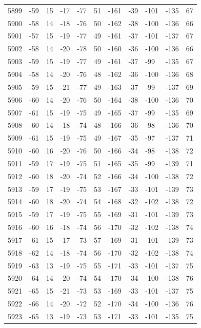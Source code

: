 \begin{table}[H]
\begin{tabular}{lllllllllll}
5899 & -59 & 15 & -17 & -77 & 51 & -161 & -39 & -101 & -135 & 67 \\
5900 & -58 & 14 & -18 & -76 & 50 & -162 & -38 & -100 & -136 & 66 \\
5901 & -57 & 15 & -19 & -77 & 49 & -161 & -37 & -101 & -137 & 67 \\
5902 & -58 & 14 & -20 & -78 & 50 & -160 & -36 & -100 & -136 & 66 \\
5903 & -59 & 15 & -19 & -77 & 49 & -161 & -37 & -99 & -135 & 67 \\
5904 & -58 & 14 & -20 & -76 & 48 & -162 & -36 & -100 & -136 & 68 \\
5905 & -59 & 15 & -21 & -77 & 49 & -163 & -37 & -99 & -137 & 69 \\
5906 & -60 & 14 & -20 & -76 & 50 & -164 & -38 & -100 & -136 & 70 \\
5907 & -61 & 15 & -19 & -75 & 49 & -165 & -37 & -99 & -135 & 69 \\
5908 & -60 & 14 & -18 & -74 & 48 & -166 & -36 & -98 & -136 & 70 \\
5909 & -61 & 15 & -19 & -75 & 49 & -167 & -35 & -97 & -137 & 71 \\
5910 & -60 & 16 & -20 & -76 & 50 & -166 & -34 & -98 & -138 & 72 \\
5911 & -59 & 17 & -19 & -75 & 51 & -165 & -35 & -99 & -139 & 71 \\
5912 & -60 & 18 & -20 & -74 & 52 & -166 & -34 & -100 & -138 & 72 \\
5913 & -59 & 17 & -19 & -75 & 53 & -167 & -33 & -101 & -139 & 73 \\
5914 & -60 & 18 & -20 & -74 & 54 & -168 & -32 & -102 & -138 & 72 \\
5915 & -59 & 17 & -19 & -75 & 55 & -169 & -31 & -101 & -139 & 73 \\
5916 & -60 & 16 & -18 & -74 & 56 & -170 & -32 & -102 & -138 & 74 \\
5917 & -61 & 15 & -17 & -73 & 57 & -169 & -31 & -101 & -139 & 73 \\
5918 & -62 & 14 & -18 & -74 & 56 & -170 & -32 & -102 & -138 & 74 \\
5919 & -63 & 13 & -19 & -75 & 55 & -171 & -33 & -101 & -137 & 75 \\
5920 & -64 & 14 & -20 & -74 & 54 & -170 & -34 & -100 & -138 & 76 \\
5921 & -65 & 15 & -21 & -73 & 53 & -169 & -33 & -101 & -137 & 75 \\
5922 & -66 & 14 & -20 & -72 & 52 & -170 & -34 & -100 & -136 & 76 \\
5923 & -65 & 13 & -19 & -73 & 53 & -171 & -33 & -101 & -135 & 75 \\

\end{tabular}
\end{table}
